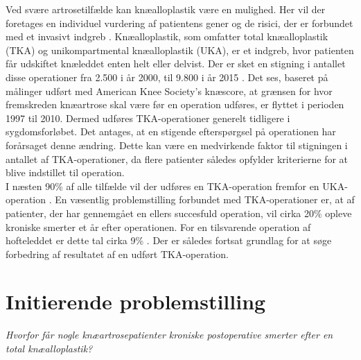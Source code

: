 Ved svære artrosetilfælde kan knæalloplastik være en mulighed. Her vil der foretages en individuel vurdering af patientens gener og de risici, der er forbundet med et invasivt indgreb \citep{schroder}. Knæalloplastik, som omfatter total knæalloplastik (TKA) og unikompartmental knæalloplastik (UKA), er et indgreb, hvor patienten får udskiftet knæleddet enten helt eller delvist. Der er sket en stigning i antallet disse operationer fra 2.500 i år 2000, til 9.800 i år 2015 \citep{aarsrapport2016}. Det ses, baseret på målinger udført med American Knee Society's knæscore, at grænsen for hvor fremskreden knæartrose skal være før en operation udføres, er flyttet i perioden 1997 til 2010. Dermed udføres TKA-operationer generelt tidligere i sygdomsforløbet. Det antages, at en stigende efterspørgsel på operationen har forårsaget denne ændring. \citep{aarsrapport2011} Dette kan være en medvirkende faktor til stigningen i antallet af TKA-operationer, da flere patienter således opfylder kriterierne for at blive indstillet til operation.\\
I næsten 90\% af alle tilfælde vil der udføres en TKA-operation fremfor en UKA-operation \citep{aarsrapport2016}. En væsentlig problemstilling forbundet med TKA-operationer er, at af patienter, der har gennemgået en ellers succesfuld operation, vil cirka 20\% opleve kroniske smerter et år efter operationen. For en tilsvarende operation af hofteleddet er dette tal cirka 9\% \citep{Beswick2012}. Der er således fortsat grundlag for at søge forbedring af resultatet af en udført TKA-operation.  

\section{Initierende problemstilling}
\begin{center}
	\textit{Hvorfor får nogle knæartrosepatienter kroniske postoperative smerter efter en total knæalloplastik?}
\end{center}

